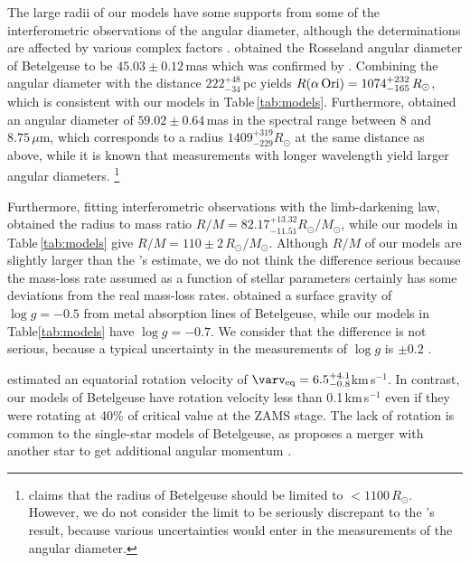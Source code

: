 \documentclass[fleqn,usenatbib]{mnras}
\begin{document}
The large radii of our models have some supports
from some of the interferometric observations of the angular diameter,
although the determinations are affected by various complex factors \citep{Dolan2016}.
\citet{Haubois2009} obtained the Rosseland angular diameter of Betelgeuse to be
$45.03 \pm 0.12$\,mas which was confirmed by \citet{Neilson2011}.
Combining the angular diameter with the distance $222^{+48}_{-34}\,$pc 
\citep{Harper2017} yields $R(\alpha\,{\rm Ori}) = 1074^{+232}_{-165}\,R_\odot$,
which is consistent with our models in Table\,\ref{tab:models}.
Furthermore, \citet{Cannon2023} obtained an angular diameter of $59.02\pm0.64$\,mas   
in the spectral range between 8 and $8.75\,\mu$m, which 
corresponds to a radius $1409^{+319}_{-229}R_\odot$ at the same distance as above,
while it is known that measurements with longer wavelength 
yield larger angular diameters.
{\footnote{\citet{Molnar2023} claims that the radius of Betelgeuse 
should be limited to $<1100\,R_\odot$. However, we do not consider the
limit to be seriously discrepant to the \citet{Haubois2009}'s result, because 
various uncertainties would enter in the 
measurements of the angular diameter.}  }

Furthermore, fitting interferometric observations with the limb-darkening law,
\citet{Neilson2011} obtained the radius to mass ratio 
$R/M = 82.17^{+13.32}_{-11.51}R_\odot/M_\odot$, while our models 
in Table\,\ref{tab:models} give $R/M = 110 \pm 2\,R_\odot/M_\odot$.
Although $R/M$ of our models are slightly larger than the \citet{Neilson2011}'s estimate, we do not think the difference serious because
the mass-loss rate assumed as a function of stellar parameters certainly has 
some deviations from the real mass-loss rates.
\citet{Lobel2000} obtained a surface gravity of $\log g=-0.5$
from metal absorption lines of Betelgeuse, 
while our models in Table\ref{tab:models} have $\log g= -0.7$.
We consider that the difference is not serious, because a typical uncertainty
in the measurements of $\log g$ is $\pm0.2$ \citep[e.g.][]{Smalley2005}. 

\citet{Kervella2018} estimated an equatorial rotation velocity of
$\varv_{\rm eq}=6.5^{+4.1}_{-0.8}$km\,s$^{-1}$.  
In contrast, our models of Betelgeuse have rotation 
velocity less than 0.1\,km\,s$^{-1}$ 
even if they were rotating at 40\% of critical value at the ZAMS stage. 
The lack of rotation is common to the single-star models of Betelgeuse, as \citet{Wheeler2017} proposes a merger with another star to get additional angular momentum  \citep[see also][]{Sullivan2020}. 
\end{document}
